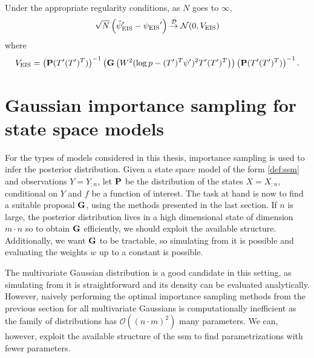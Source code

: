\begin{theorem}
    Under the appropriate regularity conditions, as $N$ goes to $\infty$,
    $$
    \sqrt{N} \left( \hpeis' - \peis' \right) \Dto \mathcal N (0, V_{\text{EIS}})
    $$
    where 
    $$
    V_{\text{EIS}} = \left(\P (T'(T')^{T})\right)^{-1} \left(\G \left(W^{2}(\log p - (T')^{T}\psi')^{2}T'(T')^{T}\right)\right)\left(\P (T'(T')^{T})\right)^{-1}.
    $$
\end{theorem}


\section{Gaussian importance sampling for state space models}
\label{sec:gaussian_importance_sampling_for_state_space_models}

For the types of models considered in this thesis, importance sampling is used to infer the posterior distribution. Given a state space model of the form \eqref{def:ssm} and observations $Y = Y_{:n}$, let $\P$ be the distribution of the states $X=X_{:n}$, conditional on $Y$ and $f$ be a function of interest. The task at hand is now to find a suitable proposal $\G$, using the methods presented in the last section. If $n$ is large, the posterior distribution lives in a high dimensional state of dimension $m\cdot n$ so to obtain $\G$ efficiently, we should exploit the available structure. Additionally, we want $\G$ to be tractable, so simulating from it is possible and evaluating the weights $w$ up to a constant is possible. 

The multivariate Gaussian distribution is a good candidate in this setting, as simulating from it is straightforward and its density can be evaluated analytically. However, naively performing the optimal importance sampling methods from the previous section for all multivariate Gaussians is computationally inefficient as the family of distributions has $\mathcal O((n\cdot m)^{2})$ many parameters. We can, however, exploit the available structure of the \gls{ssm} to find parametrizations with fewer parameters. 

